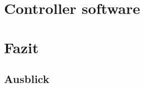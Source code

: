 \hypertarget{controller-software}{%
\section{Controller software}\label{controller-software}}

\hypertarget{fazit}{%
\section{Fazit}\label{fazit}}

\hypertarget{ausblick}{%
\subsection{Ausblick}\label{ausblick}}
